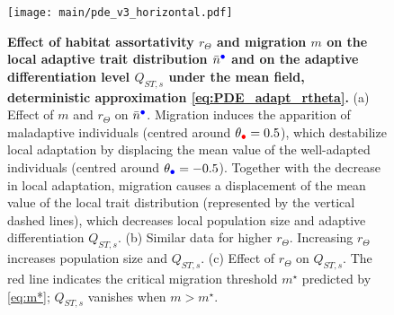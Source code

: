 \begin{figure}[ht]
  \centering
  \texttt{[image: main/pde\_v3\_horizontal.pdf]}
    \caption{\textbf{Effect of habitat assortativity $r_\Theta$ and migration $m$ on the local adaptive trait distribution $\bar{n}^{\bcirc}$ and on the adaptive differentiation level $Q_{ST,s}$ under the mean field, deterministic approximation \cref{eq:PDE_adapt_rtheta}.} (a) Effect of $m$ and $r_\Theta$ on $\bar{n}^{\bcirc}$. Migration induces the apparition of maladaptive individuals (centred around $\theta_{\rcirc} = 0.5$), which destabilize local adaptation by displacing the mean value of the well-adapted individuals (centred around $\theta_{\bcirc} = -0.5$). Together with the decrease in local adaptation, migration causes a displacement of the mean value of the local trait distribution (represented by the vertical dashed lines), which decreases local population size and adaptive differentiation $Q_{ST,s}$. (b) Similar data for higher $r_\Theta$. Increasing $r_\Theta$ increases population size and $Q_{ST,s}$. (c) Effect of $r_\Theta$ on $Q_{ST,s}$. The red line indicates the critical migration threshold $m^\star$ predicted by \cref{eq:m*}; $Q_{ST,s}$ vanishes when $m > m^\star$.}\label{fig:heatmap_betas_m_rtheta}
\end{figure}
\FloatBarrier

